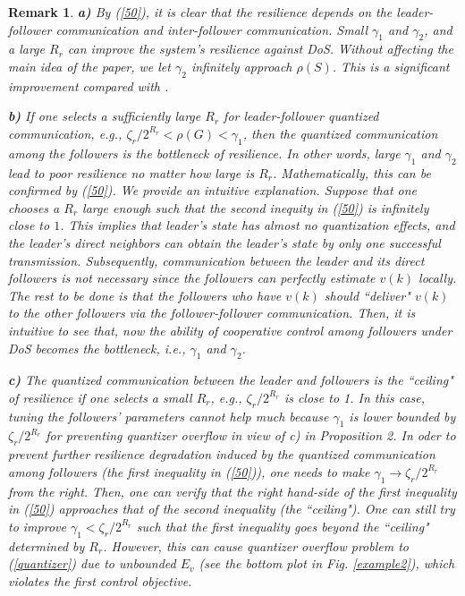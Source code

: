 \documentclass{autart}
\newtheorem{itremark}{Remark}
\newenvironment{remark}{\begin{itremark}\rm}{\end{itremark}}
\begin{document}
\begin{remark}
\textbf{a)} By (\ref{50}), it is clear that the resilience depends on the leader-follower communication and inter-follower communication. Small $\gamma_1$ and $\gamma_2$, and a large $R_r$ can improve the system's resilience against DoS. Without affecting the main idea of the paper, we let $\gamma_2$ infinitely approach $\rho(S)$. This is a significant improvement compared with \cite{feng2020arxiv, feng2023tcns}. 


\textbf{b)} If one selects a sufficiently large $R_r$ for leader-follower quantized communication, e.g., $\zeta_r / 2^{R_r} < \rho(G) < \gamma_1$, then the quantized communication among the followers is the bottleneck of resilience. In other words, large $\gamma_1$ and $\gamma_2$ lead to poor resilience no matter how large is $R_r$. Mathematically, this can be confirmed by (\ref{50}). We provide an intuitive explanation. Suppose that one chooses a $R_r$ large enough such that 
the second inequity in (\ref{50}) is infinitely close to $1$. This implies that leader's state has almost no quantization effects, and the leader's direct neighbors can obtain the leader's state by only one successful transmission. Subsequently, communication between the leader and its direct followers is not necessary since the followers can perfectly estimate $v(k)$ locally. 
The rest to be done is that the followers who have $v(k)$ should ``deliver" $v(k)$ to the other followers via the follower-follower communication. Then, it is intuitive to see that, now the ability of cooperative control among followers under DoS becomes the bottleneck, i.e., $\gamma_1$ and $\gamma_2$. 


\textbf{c)} The quantized communication between the leader and followers is the ``ceiling" of resilience if one selects a small $R_r$, e.g., $\zeta_r / 2^{R_r}$ is close to 1. In this case, tuning the followers' parameters cannot help much because $\gamma_1$ is lower bounded by $\zeta_r / 2^{R_r}$ for preventing quantizer overflow in view of c) in Proposition 2. In oder to prevent further resilience degradation induced by the quantized communication among followers (the first inequality in (\ref{50})), one needs to make $\gamma_1 \to \zeta_r / 2^{R_r} $ from the right. Then, one can verify that the right hand-side of the first inequality in (\ref{50}) approaches that of the second inequality (the ``ceiling").
One can still try to improve $\gamma_1 <  \zeta_r / 2^{R_r}$ such that the first inequality goes beyond the ``ceiling" determined by $R_r$. However, this can cause quantizer overflow problem to (\ref{quantizer}) due to unbounded $E_v$ (see the bottom plot in Fig. \ref{example2}), which violates the first control objective.     



\end{remark}
\end{document}
